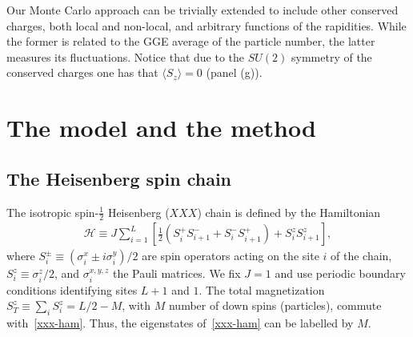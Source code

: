 \documentclass[twocolumn,superscriptaddress,prb,10pt]{revtex4-1}
\begin{document}
Our Monte Carlo approach can be trivially extended to include other conserved 
charges, both local and non-local, and arbitrary functions of the rapidities. 
While the former is related to the GGE average of the particle number, the 
latter measures its fluctuations. Notice that due to the $SU(2)$ symmetry 
of the conserved charges one has that $\langle S_z\rangle=0$ (panel (g)). 




\section{The model and the method}


\subsection{The Heisenberg spin chain}

The isotropic spin-$\frac{1}{2}$ Heisenberg ($XXX$) chain is defined by the 
Hamiltonian 
%
\begin{align}
\label{xxx-ham}
{\mathcal H}\equiv J\sum\limits_{i=1}^L\left[\frac{1}{2}(S_i^+S^-_{i+1} 
+S_i^{-}S_{i+1}^+)+S_i^zS_{i+1}^z\right],  
\end{align}
%
where $S^{\pm}_i\equiv (\sigma_i^x\pm i\sigma_i^y)/2$ are spin operators 
acting on the site $i$ of the chain, $S_i^z\equiv\sigma_i^z/2$, and 
$\sigma^{x,y,z}_i$ the Pauli matrices. We fix $J=1$ and use periodic 
boundary conditions identifying sites $L+1$ and $1$. The total magnetization 
$S_{T}^z\equiv\sum_iS_i^z=L/2-M$, with $M$ number of down spins (particles), 
commute with~\eqref{xxx-ham}. Thus, the eigenstates of~\eqref{xxx-ham} can 
be labelled by $M$. 
\end{document}
